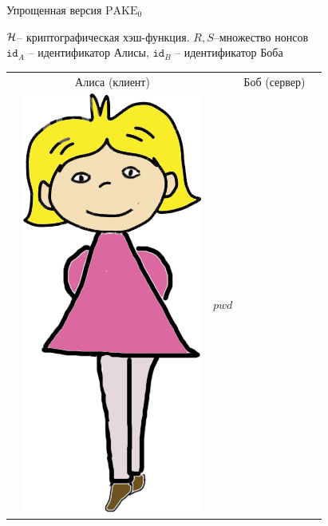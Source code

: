 \documentclass[usenames,dvipsnames,8pt,aspectratio=169]{beamer}
\begin{document}
\begin{frame}{Упрощенная версия $\text{PAKE}_0$}
\vspace{-20pt}
	\Large
	\begin{center}
		$\mathcal{H}$-- криптографическая хэш-функция. $R, S$--множество нонсов \\[5pt]
		$\mathtt{id}_{A}$ -- идентификатор Алисы, $\mathtt{id}_{B}$ -- идентификатор Боба\\[10pt]
		
		\large 
		\begin{center}
			\begin{tabular}{l c c c l}
				& Алиса (клиент)  & & Боб (сервер) &  \\
				& \multirow{5}{*}{\includegraphics[scale=0.15]{Alice}} & {\huge $pwd$} &  \hspace{-20pt}

\end{tabular}
\end{center}
\end{center}
\end{frame}
\end{document}
